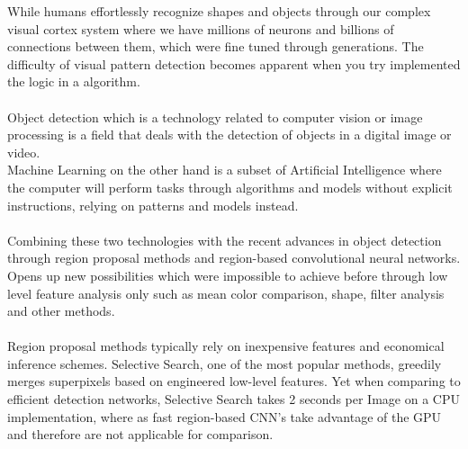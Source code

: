 
While humans effortlessly recognize shapes and objects through our complex visual cortex system where we have millions of neurons and
billions of connections between them, which were fine tuned through generations. The difficulty of visual pattern detection becomes apparent
when you try implemented the logic in a algorithm.\cite{neuralnetworksanddeeplearning}  \\ \\
Object detection which is a technology related to computer vision or image processing is a field that deals with the detection of objects in
a digital image or video. \\
Machine Learning on the other hand is a subset of Artificial Intelligence where the computer will perform tasks through algorithms and
models without explicit instructions, relying on patterns  and models instead.\\ \\
Combining these two technologies with the recent advances in object detection through region proposal methods and region-based convolutional
neural networks. Opens up new possibilities which were impossible to achieve before through low level feature analysis only such as mean
color comparison, shape, filter analysis and other methods. \\ \\
Region proposal methods typically rely on inexpensive features and economical inference schemes. Selective Search, one of the most popular
methods, greedily merges superpixels based on engineered low-level features. Yet when comparing to efficient detection networks, Selective
Search takes 2 seconds per Image on a CPU implementation, where as fast region-based CNN's take advantage of the GPU and therefore are not
applicable for comparison.\cite{fasterrcnn} \\

